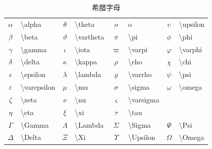 \documentclass[a4paper]{ctexart}
\begin{document}
    \begin{table}[H]
        \centering
        \caption{希腊字母}
        \begin{tabular}{clclclcl}
            \toprule
            $\alpha$        & \textbackslash alpha      & $\theta$      & \textbackslash theta      &
            $o$             & o                         & $\upsilon$    & \textbackslash upsilon    \\
            $\beta$         & \textbackslash beta       & $\vartheta$   & \textbackslash vartheta   &
            $\pi$           & \textbackslash pi         & $\phi$        & \textbackslash phi        \\
            $\gamma$        & \textbackslash gamma      & $\iota$       & \textbackslash iota       &
            $\varpi$        & \textbackslash varpi      & $\varphi$     & \textbackslash varphi     \\
            $\delta$        & \textbackslash delta      & $\kappa$      & \textbackslash kappa      &
            $\rho$          & \textbackslash rho        & $\chi$        & \textbackslash chi        \\
            $\epsilon$      & \textbackslash epsilon    & $\lambda$     & \textbackslash lambda     &
            $\varrho$       & \textbackslash varrho     & $\psi$        & \textbackslash psi        \\
            $\varepsilon$   & \textbackslash varepsilon & $\mu$         & \textbackslash mu         & 
            $\sigma$        & \textbackslash sigma      & $\omega$      & \textbackslash omega      \\
            $\zeta$         & \textbackslash zeta       & $\nu$         & \textbackslash nu         &
            $\varsigma$     & \textbackslash varsigma                                               \\ 
            $\eta$          & \textbackslash eta        & $\xi$         & \textbackslash xi         & 
            $\tau$          & \textbackslash tau                                                    \\
            \midrule
            $\Gamma$        & \textbackslash Gamma      & $\Lambda$     & \textbackslash Lambda     &
            $\Sigma$        & \textbackslash Sigma      & $\Psi$        & \textbackslash Psi        \\
            $\Delta$        & \textbackslash Delta      & $\Xi$         & \textbackslash Xi         &
            $\Upsilon$      & \textbackslash Upsilon    & $\Omega$      & \textbackslash Omega      \\

\end{tabular}
\end{table}
\end{document}
